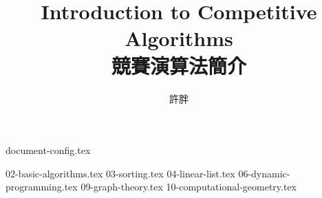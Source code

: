 \documentclass[12pt,a4paper,oneside]{book}
\begin{document}
\begin{CJK}{UTF8}{bkai}

{document-config.tex}
\title{Introduction to Competitive Algorithms\\競賽演算法簡介}
\author{許胖}
\maketitle
\tableofcontents

\setcounter{chapter}{1}
{02-basic-algorithms.tex}
{03-sorting.tex}
{04-linear-list.tex}
{06-dynamic-programming.tex}
\setcounter{chapter}{8}
{09-graph-theory.tex}
{10-computational-geometry.tex}

\printindex[noun]

\listoffigures
\clearpage
\end{CJK}
\end{document}
